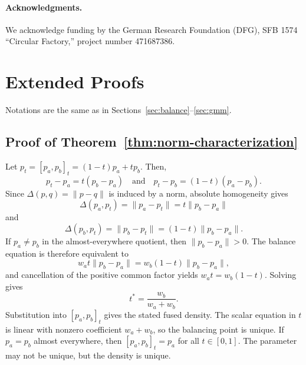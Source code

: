 \documentclass[runningheads]{llncs}
\newcommand{\norm}[1]{\lVert #1\rVert}
\begin{document}
\paragraph{\textbf{Acknowledgments.}}
We acknowledge funding by the German Research Foundation (DFG), SFB 1574 ``Circular Factory,'' project number 471687386.





\clearpage
\appendix
\renewcommand{\theHsection}{appendix.\Alph{section}}
\section{Extended Proofs}\label{app:proofs}

Notations are the same as in Sections~\ref{sec:balance}--\ref{sec:gmm}.

\subsection*{Proof of Theorem~\ref{thm:norm-characterization}}

Let $p_t=[p_a,p_b]_t=(1-t)p_a+tp_b$. Then,
\begin{equation*}
  p_t-p_a=t(p_b-p_a)
  \quad\text{and}\quad
  p_t-p_b=(1-t)(p_a-p_b).
\end{equation*}
Since $\Delta(p,q)=\norm{p-q}$ is induced by a norm, absolute homogeneity gives
\begin{equation*}
  \Delta(p_a,p_t)=\norm{p_a-p_t}=t\norm{p_b-p_a}
\end{equation*}
and
\begin{equation*}
  \Delta(p_b,p_t)=\norm{p_b-p_t}=(1-t)\norm{p_b-p_a}.
\end{equation*}
If $p_a\neq p_b$ in the almost-everywhere quotient, then $\norm{p_b-p_a}>0$. The balance equation is therefore equivalent to
\begin{equation*}
  w_a t\norm{p_b-p_a}=w_b(1-t)\norm{p_b-p_a},
\end{equation*}
and cancellation of the positive common factor yields $w_at=w_b(1-t)$. Solving gives
\begin{equation*}
  t^*=\frac{w_b}{w_a+w_b}.
\end{equation*}
Substitution into $[p_a,p_b]_t$ gives the stated fused density. The scalar equation in $t$ is linear with nonzero coefficient $w_a+w_b$, so the balancing point is unique. If $p_a=p_b$ almost everywhere, then $[p_a,p_b]_t=p_a$ for all $t\in[0,1]$. The parameter may not be unique, but the density is unique.
\end{document}
